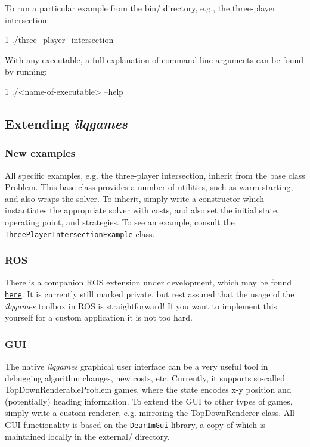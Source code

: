 To run a particular example from the {\ttfamily bin/} directory, e.\+g., the three-\/player intersection\+: 
\begin{DoxyCode}
1 ./three\_player\_intersection
\end{DoxyCode}


With any executable, a full explanation of command line arguments can be found by running\+: 
\begin{DoxyCode}
1 ./<name-of-executable> --help
\end{DoxyCode}


\subsection*{Extending {\itshape ilqgames}}

\subsubsection*{New examples}

All specific examples, e.\+g. the three-\/player intersection, inherit from the base class {\ttfamily Problem}. This base class provides a number of utilities, such as warm starting, and also wraps the solver. To inherit, simply write a constructor which instantiates the appropriate solver with costs, and also set the initial state, operating point, and strategies. To see an example, consult the \href{https://github.com/HJReachability/ilqgames/blob/master/src/three_player_intersection_example.cpp}{\tt Three\+Player\+Intersection\+Example} class.

\subsubsection*{R\+OS}

There is a companion R\+OS extension under development, which may be found \href{https://github.com/HJReachability/ilqgames_ros}{\tt here}. It is currently still marked private, but rest assured that the usage of the {\itshape ilqgames} toolbox in R\+OS is straightforward! If you want to implement this yourself for a custom application it is not too hard.

\subsubsection*{G\+UI}

The native {\itshape ilqgames} graphical user interface can be a very useful tool in debugging algorithm changes, new costs, etc. Currently, it supports so-\/called {\ttfamily Top\+Down\+Renderable\+Problem} games, where the state encodes x-\/y position and (potentially) heading information. To extend the G\+UI to other types of games, simply write a custom renderer, e.\+g. mirroring the {\ttfamily Top\+Down\+Renderer} class. All G\+UI functionality is based on the \href{https://github.com/ocornut/imgui}{\tt Dear\+Im\+Gui} library, a copy of which is maintained locally in the {\ttfamily external/} directory. 
